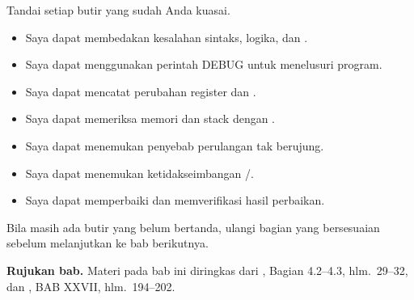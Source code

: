 \begin{checklistbox}
\vspace{1.1em}
Tandai setiap butir yang sudah Anda kuasai.

\begin{itemize}
    \item[\checkbox] Saya dapat membedakan kesalahan sintaks, logika,
          dan .
    \item[\checkbox] Saya dapat menggunakan perintah DEBUG untuk
          menelusuri program.
    \item[\checkbox] Saya dapat mencatat perubahan register dan
          .
    \item[\checkbox] Saya dapat memeriksa memori dan stack dengan
          .
    \item[\checkbox] Saya dapat menemukan penyebab perulangan tak
          berujung.
    \item[\checkbox] Saya dapat menemukan ketidakseimbangan
          /.
    \item[\checkbox] Saya dapat memperbaiki dan memverifikasi hasil
          perbaikan.
\end{itemize}

\vspace{0.4em}
Bila masih ada butir yang belum bertanda, ulangi bagian yang
bersesuaian sebelum melanjutkan ke bab berikutnya.
\end{checklistbox}

\begin{infobox}
\vspace{1.1em}
\textbf{Rujukan bab.} Materi pada bab ini diringkas dari
\cite{gunawan2019}, Bagian 4.2--4.3, hlm.~29--32, dan
\cite{sto2001}, BAB XXVII, hlm.~194--202.
\end{infobox}
